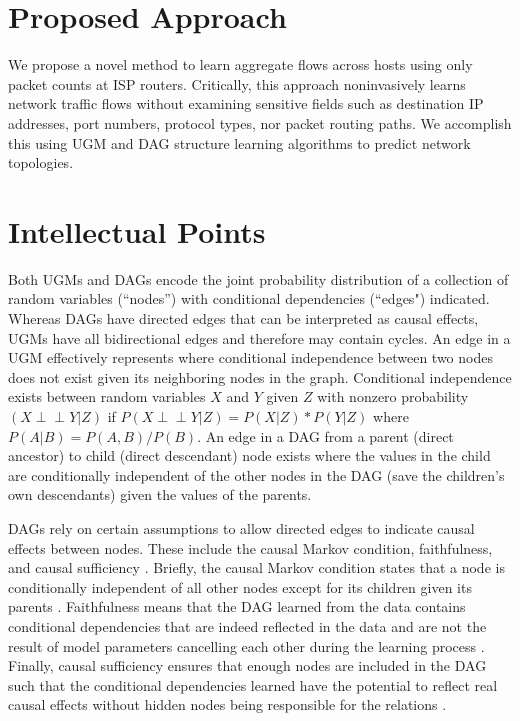 \documentclass[conference]{IEEEtran}
\newcommand\ci{\perp\!\!\!\perp}
\begin{document}
\section{Proposed Approach}

We propose a novel method to learn aggregate flows across hosts using only packet counts at ISP routers. Critically, this approach noninvasively learns network traffic flows without examining sensitive fields such as destination IP addresses, port numbers, protocol types, nor packet routing paths. We accomplish this using UGM and DAG structure learning algorithms to predict network topologies.

\section{Intellectual Points}

Both UGMs and DAGs encode the joint probability distribution of a collection of random variables (``nodes”) with conditional dependencies (``edges") indicated. Whereas DAGs have directed edges that can be interpreted as causal effects, UGMs have all bidirectional edges and therefore may contain cycles. An edge in a UGM effectively represents where conditional independence between two nodes does not exist given its neighboring nodes in the graph. Conditional independence exists between random variables $X$ and $Y$ given $Z$ with nonzero probability $\left(X \ci Y | Z \right)$ if $P(X \ci Y | Z) = P(X | Z) * P(Y | Z)$ where $P(A | B) = P(A, B) / P(B)$. An edge in a DAG from a parent (direct ancestor) to child (direct descendant) node exists where the values in the child are conditionally independent of the other nodes in the DAG (save the children's own descendants) given the values of the parents.

DAGs rely on certain assumptions to allow directed edges to indicate causal effects between nodes. These include the causal Markov condition, faithfulness, and causal sufficiency \cite{b6}. Briefly, the causal Markov condition states that a node is conditionally independent of all other nodes except for its children given its parents \cite{b7}. Faithfulness means that the DAG learned from the data contains conditional dependencies that are indeed reflected in the data and are not the result of model parameters cancelling each other during the learning process \cite{b8}. Finally, causal sufficiency ensures that enough nodes are included in the DAG such that the conditional dependencies learned have the potential to reflect real causal effects without hidden nodes being responsible for the relations \cite{b8}.
\end{document}
